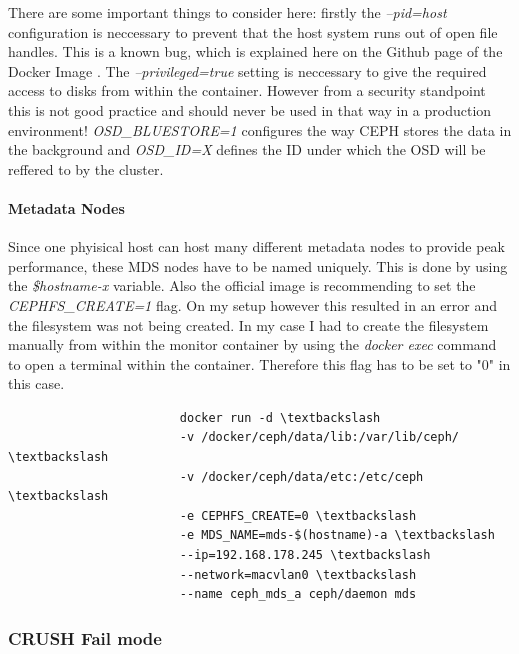 \documentclass[titlepage, a4paper, 11pt]{scrartcl}
\begin{document}
                    There are some important things to consider here: firstly the \textit{--pid=host} configuration is neccessary to prevent that the host system
                    runs out of open file handles. This is a known bug, which is explained here on the Github page of the Docker Image \cite{cephdockerbug}. The 
                    \textit{--privileged=true} setting is neccessary to give the required access to disks from within the container. However from a security standpoint this is not good practice and should never be used in that way in a production environment! \textit{OSD\_BLUESTORE=1} configures the way CEPH stores the data in the background and \textit{OSD\_ID=X} defines the ID under which the OSD will be reffered to by the cluster.

                \paragraph{Metadata Nodes}

                    Since one phyisical host can host many different metadata nodes to provide peak performance, these MDS nodes have to be named uniquely. This is done 
                    by using the \textit{\$hostname-x} variable. Also the official image is recommending to set the \textit{CEPHFS\_CREATE=1} flag. On my setup however this resulted in an error and the filesystem was not being created. In my case I had to create the filesystem manually from within the monitor container by using the \textit{docker exec} command to open a terminal within the container. Therefore this flag has to be set to "0" in this case.

                    \begin{lstlisting}
                        docker run -d \textbackslash
                        -v /docker/ceph/data/lib:/var/lib/ceph/ \textbackslash
                        -v /docker/ceph/data/etc:/etc/ceph \textbackslash
                        -e CEPHFS_CREATE=0 \textbackslash
                        -e MDS_NAME=mds-$(hostname)-a \textbackslash
                        --ip=192.168.178.245 \textbackslash
                        --network=macvlan0 \textbackslash
                        --name ceph_mds_a ceph/daemon mds
                    \end{lstlisting}   
                    
            \subsubsection{CRUSH Fail mode}\label{system:crush-fail}
\end{document}
